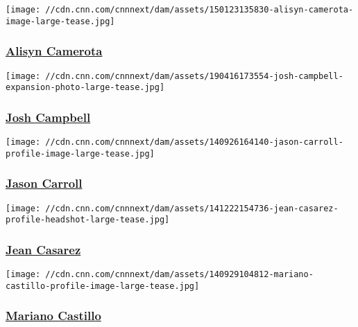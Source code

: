 \href{/profiles/alisyn-camerota-profile}{}

\texttt{[image: //cdn.cnn.com/cnnnext/dam/assets/150123135830-alisyn-camerota-image-large-tease.jpg]}

\hypertarget{alisyn-camerota}{%
\subsubsection{\texorpdfstring{\href{/profiles/alisyn-camerota-profile}{Alisyn
Camerota}}{Alisyn Camerota}}\label{alisyn-camerota}}

\href{/profiles/josh-campbell}{}

\texttt{[image: //cdn.cnn.com/cnnnext/dam/assets/190416173554-josh-campbell-expansion-photo-large-tease.jpg]}

\hypertarget{josh-campbell}{%
\subsubsection{\texorpdfstring{\href{/profiles/josh-campbell}{Josh
Campbell}}{Josh Campbell}}\label{josh-campbell}}

\href{/profiles/jason-carroll-profile}{}

\texttt{[image: //cdn.cnn.com/cnnnext/dam/assets/140926164140-jason-carroll-profile-image-large-tease.jpg]}

\hypertarget{jason-carroll}{%
\subsubsection{\texorpdfstring{\href{/profiles/jason-carroll-profile}{Jason
Carroll}}{Jason Carroll}}\label{jason-carroll}}

\href{/profiles/jean-casarez-profile}{}

\texttt{[image: //cdn.cnn.com/cnnnext/dam/assets/141222154736-jean-casarez-profile-headshot-large-tease.jpg]}

\hypertarget{jean-casarez}{%
\subsubsection{\texorpdfstring{\href{/profiles/jean-casarez-profile}{Jean
Casarez}}{Jean Casarez}}\label{jean-casarez}}

\href{/profiles/mariano-castillo}{}

\texttt{[image: //cdn.cnn.com/cnnnext/dam/assets/140929104812-mariano-castillo-profile-image-large-tease.jpg]}

\hypertarget{mariano-castillo}{%
\subsubsection{\texorpdfstring{\href{/profiles/mariano-castillo}{Mariano
Castillo}}{Mariano Castillo}}\label{mariano-castillo}}

